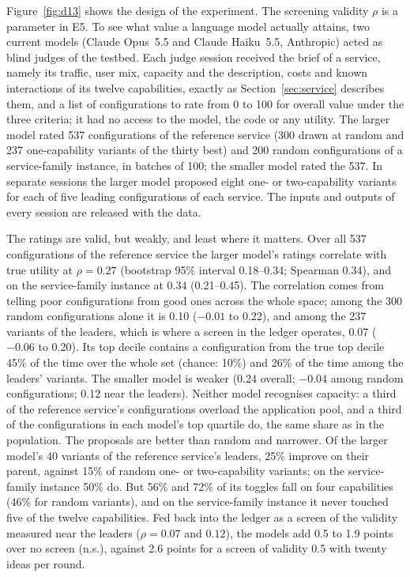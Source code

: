 \documentclass[preprint,12pt,authoryear]{elsarticle}
\theoremstyle{definition}
\begin{document}
Figure~\ref{fig:d13} shows the design of the experiment. The screening validity $\rho$ is a parameter in E5. To see what value a language model actually attains, two current models (Claude Opus~5.5 and Claude Haiku~5.5, Anthropic) acted as blind judges of the testbed. Each judge session received the brief of a service, namely its traffic, user mix, capacity and the description, costs and known interactions of its twelve capabilities, exactly as Section~\ref{sec:service} describes them, and a list of configurations to rate from 0 to 100 for overall value under the three criteria; it had no access to the model, the code or any utility. The larger model rated 537 configurations of the reference service (300 drawn at random and 237 one-capability variants of the thirty best) and 200 random configurations of a service-family instance, in batches of 100; the smaller model rated the 537. In separate sessions the larger model proposed eight one- or two-capability variants for each of five leading configurations of each service. The inputs and outputs of every session are released with the data.

The ratings are valid, but weakly, and least where it matters. Over all 537 configurations of the reference service the larger model's ratings correlate with true utility at $\rho=0.27$ (bootstrap 95\% interval 0.18--0.34; Spearman 0.34), and on the service-family instance at 0.34 (0.21--0.45). The correlation comes from telling poor configurations from good ones across the whole space; among the 300 random configurations alone it is 0.10 ($-0.01$ to 0.22), and among the 237 variants of the leaders, which is where a screen in the ledger operates, 0.07 ($-0.06$ to 0.20). Its top decile contains a configuration from the true top decile 45\% of the time over the whole set (chance: 10\%) and 26\% of the time among the leaders' variants. The smaller model is weaker (0.24 overall; $-0.04$ among random configurations; 0.12 near the leaders). Neither model recognises capacity: a third of the reference service's configurations overload the application pool, and a third of the configurations in each model's top quartile do, the same share as in the population. The proposals are better than random and narrower. Of the larger model's 40 variants of the reference service's leaders, 25\% improve on their parent, against 15\% of random one- or two-capability variants; on the service-family instance 50\% do. But 56\% and 72\% of its toggles fall on four capabilities (46\% for random variants), and on the service-family instance it never touched five of the twelve capabilities. Fed back into the ledger as a screen of the validity measured near the leaders ($\rho=0.07$ and $0.12$), the models add 0.5 to 1.9 points over no screen (n.s.), against 2.6 points for a screen of validity 0.5 with twenty ideas per round.
\end{document}
